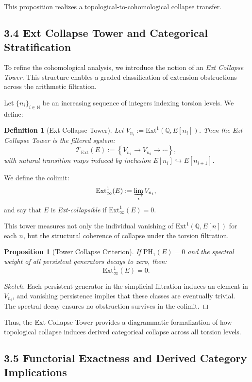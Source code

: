 \documentclass[11pt]{article}
\newtheorem{definition}[theorem]{Definition}
\newtheorem{proposition}[theorem]{Proposition}
\begin{document}
This proposition realizes a topological-to-cohomological collapse transfer.

\subsection{3.4 Ext Collapse Tower and Categorical Stratification}

To refine the cohomological analysis, we introduce the notion of an \emph{Ext Collapse Tower}. This structure enables a graded classification of extension obstructions across the arithmetic filtration.

Let $\{n_i\}_{i \in \mathbb{N}}$ be an increasing sequence of integers indexing torsion levels. We define:

\begin{definition}[Ext Collapse Tower]
Let $V_{n_i} := \mathrm{Ext}^1(\mathbb{Q}, E[n_i])$. Then the Ext Collapse Tower is the filtered system:
\[
\mathcal{T}_{\mathrm{Ext}}(E) := \left\{ V_{n_1} \to V_{n_2} \to \cdots \right\},
\]
with natural transition maps induced by inclusion $E[n_i] \hookrightarrow E[n_{i+1}]$.
\end{definition}

We define the colimit:
\[
\mathrm{Ext}^{1}_{\infty}(E) := \varinjlim_i V_{n_i},
\]
and say that $E$ is \emph{Ext-collapsible} if $\mathrm{Ext}^{1}_{\infty}(E) = 0$.

This tower measures not only the individual vanishing of $\mathrm{Ext}^1(\mathbb{Q},E[n])$ for each $n$, but the structural coherence of collapse under the torsion filtration.

\begin{proposition}[Tower Collapse Criterion]
If $\mathrm{PH}_1(E) = 0$ and the spectral weight of all persistent generators decays to zero, then:
\[
\mathrm{Ext}^{1}_{\infty}(E) = 0.
\]
\end{proposition}

\begin{proof}[Sketch]
Each persistent generator in the simplicial filtration induces an element in $V_{n_i}$, and vanishing persistence implies that these classes are eventually trivial. The spectral decay ensures no obstruction survives in the colimit.
\end{proof}

Thus, the Ext Collapse Tower provides a diagrammatic formalization of how topological collapse induces derived categorical collapse across all torsion levels.

\subsection{3.5 Functorial Exactness and Derived Category Implications}
\end{document}
